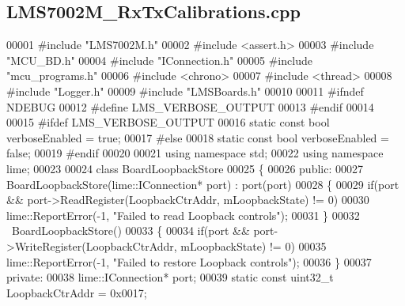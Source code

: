 \subsection{L\+M\+S7002\+M\+\_\+\+Rx\+Tx\+Calibrations.\+cpp}
\label{LMS7002M__RxTxCalibrations_8cpp_source}

\begin{DoxyCode}
00001 \textcolor{preprocessor}{#include "LMS7002M.h"}
00002 \textcolor{preprocessor}{#include <assert.h>}
00003 \textcolor{preprocessor}{#include "MCU_BD.h"}
00004 \textcolor{preprocessor}{#include "IConnection.h"}
00005 \textcolor{preprocessor}{#include "mcu_programs.h"}
00006 \textcolor{preprocessor}{#include <chrono>}
00007 \textcolor{preprocessor}{#include <thread>}
00008 \textcolor{preprocessor}{#include "Logger.h"}
00009 \textcolor{preprocessor}{#include "LMSBoards.h"}
00010 
00011 \textcolor{preprocessor}{#ifndef NDEBUG}
00012 \textcolor{preprocessor}{#define LMS\_VERBOSE\_OUTPUT}
00013 \textcolor{preprocessor}{#endif}
00014 
00015 \textcolor{preprocessor}{#ifdef LMS\_VERBOSE\_OUTPUT}
00016 \textcolor{keyword}{static} \textcolor{keyword}{const} \textcolor{keywordtype}{bool} verboseEnabled = \textcolor{keyword}{true};
00017 \textcolor{preprocessor}{#else}
00018 \textcolor{keyword}{static} \textcolor{keyword}{const} \textcolor{keywordtype}{bool} verboseEnabled = \textcolor{keyword}{false};
00019 \textcolor{preprocessor}{#endif}
00020 
00021 \textcolor{keyword}{using namespace }std;
00022 \textcolor{keyword}{using namespace }lime;
00023 
00024 \textcolor{keyword}{class }BoardLoopbackStore
00025 \{
00026 \textcolor{keyword}{public}:
00027     BoardLoopbackStore(lime::IConnection* port) : port(port)
00028     \{
00029         \textcolor{keywordflow}{if}(port && port->ReadRegister(LoopbackCtrAddr, mLoopbackState) != 0)
00030             lime::ReportError(-1, \textcolor{stringliteral}{"Failed to read Loopback controls"});
00031     \}
00032     ~BoardLoopbackStore()
00033     \{
00034         \textcolor{keywordflow}{if}(port && port->WriteRegister(LoopbackCtrAddr, mLoopbackState) != 0)
00035             lime::ReportError(-1, \textcolor{stringliteral}{"Failed to restore Loopback controls"});
00036     \}
00037 \textcolor{keyword}{private}:
00038     lime::IConnection* port;
00039     \textcolor{keyword}{static} \textcolor{keyword}{const} uint32\_t LoopbackCtrAddr = 0x0017;

\end{DoxyCode}
